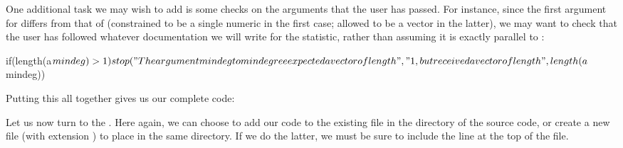 \documentclass[nojss]{jss}
\begin{document}
One additional task we may wish to add is some checks on the arguments that the
user has passed. For instance, since the first argument for 
differs from that of  (constrained to be a single numeric in the
first case; allowed to be a vector in the latter), we may want to check that the
user has followed whatever documentation we will write for the statistic, rather
than assuming it is exactly parallel to :
\begin{CodeChunk}
\begin{CodeInput}
  if(length(a$mindeg) > 1)
    stop("The argument mindeg to mindegree expected a vector of length ",
         "1, but received a vector of length ",length(a$mindeg))
\end{CodeInput}
\end{CodeChunk}

Putting this all together gives us our complete  code:
\begin{CodeChunk}
\end{CodeChunk}

Let us now turn to the . Here again, we can choose to add our code
to the existing file  in the  directory of the
 source code, or create a new file (with extension
) to place in the same directory. If we do the latter, we must be sure
to include the line  at the top of the file.
\end{document}
